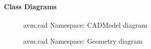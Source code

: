 \paragraph{Class Diagrams}
\begin{figure}[h!]
\caption{avm.cad Namespace: CADModel diagram}
\end{figure}

\begin{figure}[h!]
\caption{avm.cad Namespace: Geometry diagram}
\end{figure}

